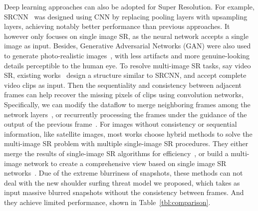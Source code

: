 Deep learning approaches can also be adopted for Super Resolution. For example, SRCNN~\cite{dong2015image} was designed using CNN by replacing pooling layers with upsampling layers, achieving notably better performance than previous approaches. It however only focuses on single image SR, as the neural network accepts a single image as input. Besides, Generative Adversarial Networks (GAN) were also used to generate photo-realistic images~\cite{ledig2017photo}, with less artifacts and more genuine-looking details perceptible to the human eye. To resolve multi-image SR tasks, say video SR, existing works~\cite{shi2016real, kappeler2016video} design a structure similar to SRCNN, and accept complete video clips as input. Then the sequentiality and consistency between adjacent frames can help recover the missing pixels of clips using convolution networks, Specifically,
we can modify the dataflow to merge neighboring frames among the network layers~\cite{huang2017video}, or recurrently processing the frames under the guidance of the output of the previous frame~\cite{sajjadi2018frame}. For images without consistency or sequential information, like satellite images, most works choose hybrid methods to solve the multi-image SR problem with multiple single-image SR procedures. They either merge the results of single-image SR algorithms for efficiency~\cite{kawulok2019deep}, or build a multi-image network to create a comprehensive view based on single image SR networks~\cite{8834937}. Due of the extreme blurriness of snapshots, these methods can not deal with the new shoulder surfing threat model we proposed, which takes as input massive blurred snapshots without the consistency between frames. And they achieve limited performance, shown in Table~\ref{tbl:comparison}.
